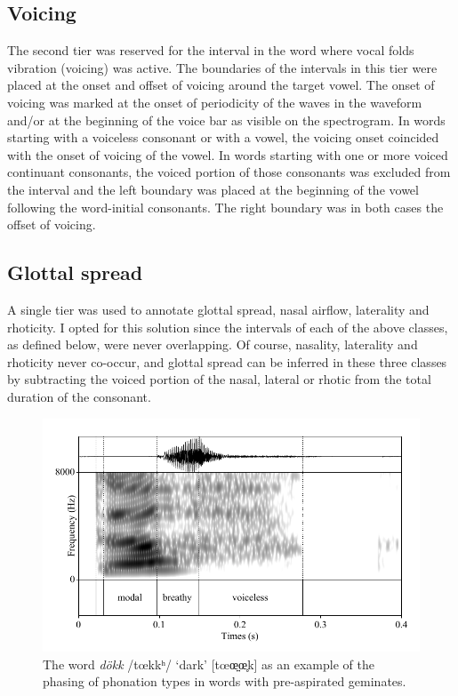 \documentclass[11pt,a4paper,oneside,openany]{memoir}\usepackage[]{graphicx}\usepackage[]{color}
\begin{document}
\subsection{Voicing}

The second tier was reserved for the interval in the word where vocal folds vibration (voicing) was active.
The boundaries of the intervals in this tier were placed at the onset and offset of voicing around the target vowel.
The onset of voicing was marked at the onset of periodicity of the waves in the waveform and/or at the beginning of the voice bar as visible on the spectrogram.
In words starting with a voiceless consonant or with a vowel, the voicing onset coincided with the onset of voicing of the vowel.
In words starting with one or more voiced continuant consonants, the voiced portion of those consonants was excluded from the interval and the left boundary was placed at the beginning of the vowel following the word-initial consonants.
The right boundary was in both cases the offset of voicing.

\subsection{Glottal spread}
A single tier was used to annotate glottal spread, nasal airflow, laterality and rhoticity.
I opted for this solution since the intervals of each of the above classes, as defined below, were never overlapping.
Of course, nasality, laterality and rhoticity never co-occur, and glottal spread can be inferred in these three classes by subtracting the voiced portion of the nasal, lateral or rhotic from the total duration of the consonant.

\begin{figure}
\centering
\includegraphics[width=\textwidth]{dokk}
\caption{The word \textit{dökk} /tœkkʰ/ `dark' [tœœ̤̤œ̥k] as an example of the phasing of phonation types in words with pre-aspirated geminates.}
\label{f:glottal-1}
\end{figure}
\end{document}
